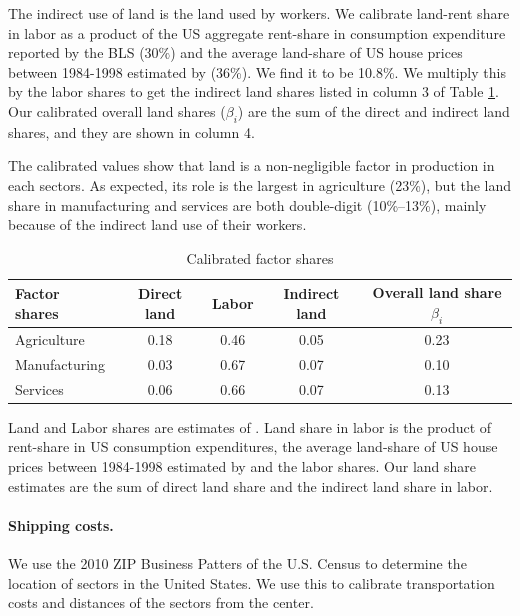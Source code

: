 \documentclass[12pt]{article}
\begin{document}
The indirect use of land is the land used by workers. We calibrate land-rent share in labor as a product of the US aggregate rent-share in consumption expenditure reported by the BLS ($30\%$) and the average land-share of US house prices between 1984-1998 estimated by  (36\%). We find it to be 10.8\%. We multiply this by the labor shares to get the indirect land shares listed in column 3 of Table \ref{tab:Sector_Shares}. Our calibrated overall land shares ($\beta_i$) are the sum of the direct and indirect land shares, and they are shown in column 4.

The calibrated values show that land is a non-negligible factor in production in each sectors. As expected, its role is the largest in agriculture (23\%), but the land share in manufacturing and services are both double-digit (10\%--13\%), mainly because of the indirect land use of their workers.


\begin{table}[h!]
\caption{Calibrated factor shares\label{tab:Sector_Shares}}
\begin{center}
\begin{tabular}{l|ccc|c}
\toprule
Factor shares & Direct land & Labor & Indirect land & Overall land share $\beta_i$ \\
\midrule
Agriculture & 0.18 & 0.46  & 0.05 & 0.23 \\
Manufacturing& 0.03 & 0.67 & 0.07 & 0.10  \\
Services    &  0.06 & 0.66 & 0.07 & 0.13 \\
\bottomrule
\end{tabular}
\end{center}

\noindent \footnotesize{Land and Labor shares are estimates of . Land share in labor is the product of rent-share in US consumption expenditures, the average land-share of US house prices between 1984-1998 estimated by  and the labor shares. Our land share estimates are the sum of direct land share and the indirect land share in labor.}
\end{table}

\paragraph{Shipping costs.}
We use the 2010 ZIP Business Patters of the U.S. Census \cite{CBP} to determine the location of sectors in the United States. We use this to calibrate transportation costs and distances of the sectors from the center.
\end{document}
